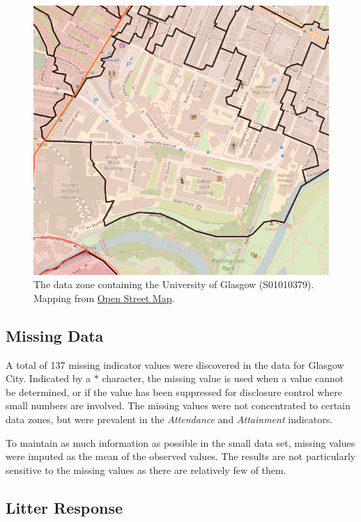 \documentclass{thesis}
\begin{document}
\begin{figure}[h]
    \centering
    \includegraphics[scale=0.5]{images/glasgow-uni-ward.PNG}
    \caption{The data zone containing the University of Glasgow (S01010379). Mapping from \href{https://www.openstreetmap.org}{Open Street Map}.}
    \label{fig:glasgow-uni-dz}
\end{figure}

\subsection*{Missing Data}

A total of 137 missing indicator values were discovered in the data for Glasgow City. Indicated by a $*$ character, the missing value is used when a value cannot be determined, or if the value has been suppressed for disclosure control where small numbers are involved. The missing values were not concentrated to certain data zones, but were prevalent in the \textit{Attendance} and \textit{Attainment} indicators. 

To maintain as much information as possible in the small data set, missing values were imputed as the mean of the observed values. The results are not particularly sensitive to the missing values as there are relatively few of them.

\subsection*{Litter Response}
\end{document}
